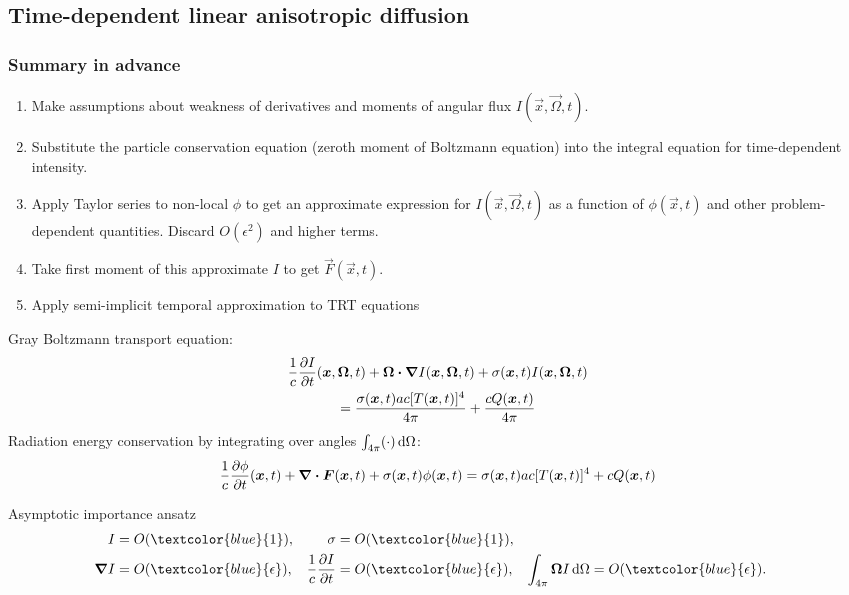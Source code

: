 \documentclass{beamer}
\newcommand{\epsiloncolor}[1]{\textcolor{blue}{#1}}
\begin{document}
\subsection{Time-dependent linear anisotropic diffusion}
\begin{frame}
  \frametitle{Summary in advance}
  \begin{enumerate}
    \item Make assumptions about weakness of derivatives and moments of angular
      flux $I(\vec{x}, \vec{\Omega}, t)$. %
    \item Substitute the particle conservation equation (zeroth moment of
      Boltzmann equation) into the integral equation for time-dependent
      intensity.
    \item Apply Taylor series to non-local $\phi$ to get an approximate
      expression for $I(\vec{x}, \vec{\Omega}, t)$ as a function of
      $\phi(\vec{x}, t)$ and other problem-dependent quantities.
      Discard $O(\epsilon^2)$ and higher terms.
    \item Take first moment of this approximate $I$ to get
      $\vec{F}(\vec{x}, t)$.
    \item Apply semi-implicit temporal approximation to TRT equations
  \end{enumerate}
\end{frame}
\begin{frame}
  Gray Boltzmann transport equation:
  \begin{multline} \label{eq:fullGrayTransport2}
  \frac{1}{c} \frac{\partial I}{\partial t}(\bm{x}, \bm{\Omega}, t)
  + \bm{\Omega} \bm{\cdot} \bm{\nabla} I(\bm{x}, \bm{\Omega}, t) +
 \sigma(\bm{x}, t) I(\bm{x}, \bm{\Omega}, t)
  \\= \frac{\sigma(\bm{x}, t) a c [T(\bm{x},t)]^4}{4\pi} 
  + \frac{c Q(\bm{x},t)}{4\pi}
  \end{multline}
  Radiation energy conservation by integrating over angles $\int_{4\pi} (\cdot) \mathop{}\!\mathrm{d}
  \Omega$:
  \begin{equation} \label{eq:grayTransportZeroth}
  \frac{1}{c} \frac{\partial \phi}{\partial t}(\bm{x}, t)
  +\bm{\nabla} \bm{\cdot} \bm{F}(\bm{x}, t) +
 \sigma(\bm{x}, t) \phi(\bm{x}, t)
  = \sigma(\bm{x}, t) a c [T(\bm{x},t)]^4
  + c Q(\bm{x},t)
  \end{equation}

  \begin{block}{Asymptotic importance ansatz}
    \begin{align*}
  I &= O(\epsiloncolor{1}), &
  \sigma &= O(\epsiloncolor{1}), \\
  \del I &= O(\epsiloncolor{\epsilon}), &
  \frac1c\pder{I}{t} &= O(\epsiloncolor{\epsilon}), &
  \int_{4\pi} \vec{\Omega} I\ud \Omega &= O(\epsiloncolor{\epsilon}).
    \end{align*}
  \end{block}
\end{frame}
\end{document}
